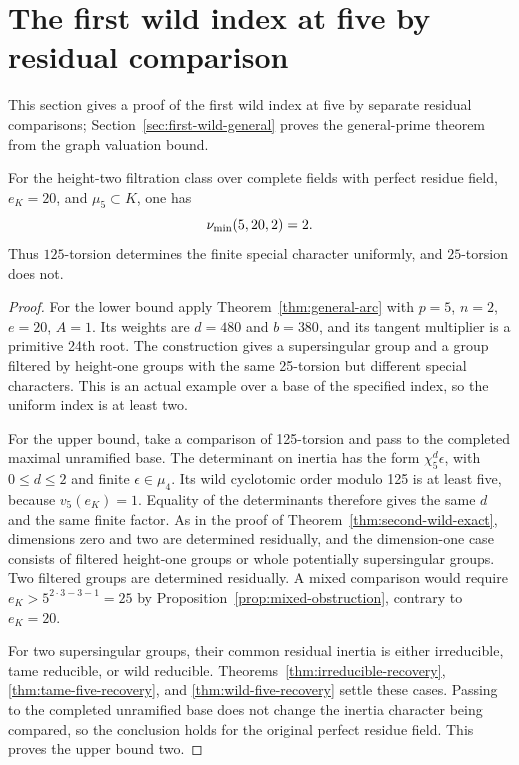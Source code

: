 \section{The first wild index at five by residual comparison}\label{sec:exact-five}
This section gives a proof of the first wild index at five by separate residual comparisons; Section~\ref{sec:first-wild-general} proves the general-prime theorem from the graph valuation bound.
\begin{theorem}\label{thm:exact-five}
For the height-two filtration class over complete fields with perfect residue field, $e_K=20$, and $\mu_5\subset K$, one has
\[
                         \nu_{\min}(5,20,2)=2.
\]
Thus $125$-torsion determines the finite special character uniformly, and $25$-torsion does not.
\end{theorem}
\begin{proof}
For the lower bound apply Theorem~\ref{thm:general-arc} with $p=5$, $n=2$, $e=20$, $A=1$. Its weights are $d=480$ and $b=380$, and its tangent multiplier is a primitive 24th root. The construction gives a supersingular group and a group filtered by height-one groups with the same 25-torsion but different special characters. This is an actual example over a base of the specified index, so the uniform index is at least two.

For the upper bound, take a comparison of 125-torsion and pass to the completed maximal unramified base. The determinant on inertia has the form $\chi_5^d\epsilon$, with $0\le d\le2$ and finite $\epsilon\in\mu_4$. Its wild cyclotomic order modulo 125 is at least five, because $v_5(e_K)=1$. Equality of the determinants therefore gives the same $d$ and the same finite factor. As in the proof of Theorem~\ref{thm:second-wild-exact}, dimensions zero and two are determined residually, and the dimension-one case consists of filtered height-one groups or whole potentially supersingular groups. Two filtered groups are determined residually. A mixed comparison would require $e_K>5^{2\cdot3-3-1}=25$ by Proposition~\ref{prop:mixed-obstruction}, contrary to $e_K=20$.

For two supersingular groups, their common residual inertia is either irreducible, tame reducible, or wild reducible. Theorems~\ref{thm:irreducible-recovery}, \ref{thm:tame-five-recovery}, and \ref{thm:wild-five-recovery} settle these cases. Passing to the completed unramified base does not change the inertia character being compared, so the conclusion holds for the original perfect residue field. This proves the upper bound two.
\end{proof}
